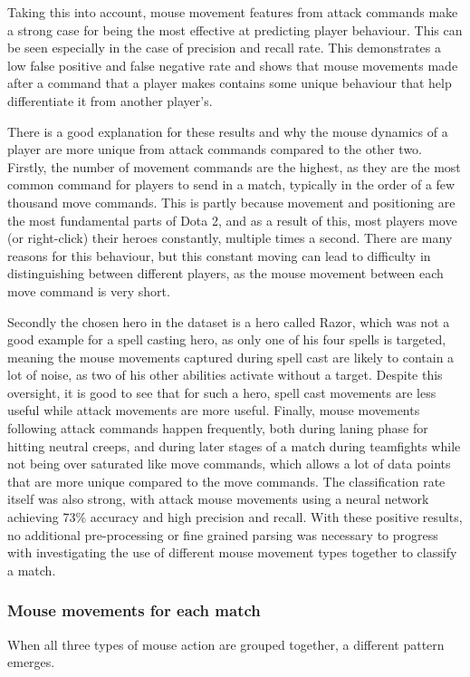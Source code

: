 \documentclass[Report.tex]{subfiles}
\begin{document}
Taking this into account, mouse movement features from attack commands make a strong case for being the most effective at predicting player behaviour. This can be seen especially in the case of precision and recall rate. This demonstrates a low false positive and false negative rate and shows that mouse movements made after a command that a player makes contains some unique behaviour that help differentiate it from another player's. 

There is a good explanation for these results and why the mouse dynamics of a player are more unique from attack commands compared to the other two. Firstly, the number of movement commands are the highest, as they are the most common command for players to send in a match, typically in the order of a few thousand move commands. This is partly because movement and positioning are the most fundamental parts of Dota 2, and as a result of this, most players move (or right-click) their heroes constantly, multiple times a second. There are many reasons for this behaviour, but this constant moving can lead to difficulty in distinguishing between different players, as the mouse movement between each move command is very short. 

Secondly the chosen hero in the dataset is a hero called Razor, which was not a good example for a spell casting hero, as only one of his four spells is targeted, meaning the mouse movements captured during spell cast are likely to contain a lot of noise, as two of his other abilities activate without a target. Despite this oversight, it is good to see that for such a hero, spell cast movements are less useful while attack movements are more useful. Finally, mouse movements following attack commands happen frequently, both during laning phase for hitting neutral creeps, and during later stages of a match during teamfights while not being over saturated like move commands, which allows a lot of data points that are more unique compared to the move commands. The classification rate itself was also strong, with attack mouse movements using a neural network achieving 73\% accuracy and high precision and recall. With these positive results, no additional pre-processing or fine grained parsing was necessary to progress with investigating the use of different mouse movement types together to classify a match.


\subsubsection{Mouse movements for each match}\label{sbsec:game-classification}
When all three types of mouse action are grouped together, a different pattern emerges. 
\end{document}
